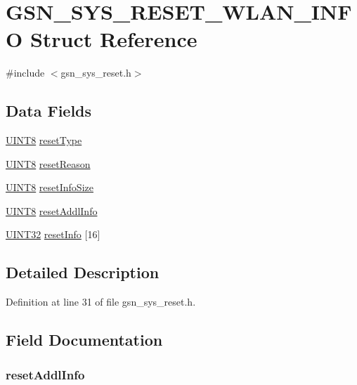\hypertarget{a00258}{
\section{GSN\_\-SYS\_\-RESET\_\-WLAN\_\-INFO Struct Reference}
\label{a00258}
}


{\ttfamily \#include $<$gsn\_\-sys\_\-reset.h$>$}

\subsection*{Data Fields}
\begin{DoxyCompactItemize}
\item 
\hyperlink{a00660_gab27e9918b538ce9d8ca692479b375b6a}{UINT8} \hyperlink{a00258_a424379d8fb70c92b5ebe7450172ed356}{resetType}
\item 
\hyperlink{a00660_gab27e9918b538ce9d8ca692479b375b6a}{UINT8} \hyperlink{a00258_a860e10ca47301c26f0cc214d9aaa74b9}{resetReason}
\item 
\hyperlink{a00660_gab27e9918b538ce9d8ca692479b375b6a}{UINT8} \hyperlink{a00258_af784980100bfb4e57308fee9850b394b}{resetInfoSize}
\item 
\hyperlink{a00660_gab27e9918b538ce9d8ca692479b375b6a}{UINT8} \hyperlink{a00258_a4f1bb86c841d8dfc393b4d39190d81e1}{resetAddlInfo}
\item 
\hyperlink{a00660_gae1e6edbbc26d6fbc71a90190d0266018}{UINT32} \hyperlink{a00258_ab5521c89f8f524c9a3e9fa8e6591b9f8}{resetInfo} \mbox{[}16\mbox{]}
\end{DoxyCompactItemize}


\subsection{Detailed Description}


Definition at line 31 of file gsn\_\-sys\_\-reset.h.



\subsection{Field Documentation}
\hypertarget{a00258_a4f1bb86c841d8dfc393b4d39190d81e1}{
\subsubsection[{resetAddlInfo}]{ {\bf resetAddlInfo}}}
\label{a00258_a4f1bb86c841d8dfc393b4d39190d81e1}


